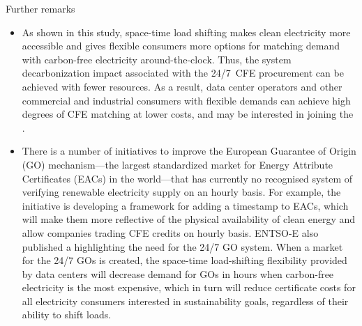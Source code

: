 \begin{frame}{Further remarks}
\label{ssec:remarks}

  {\footnotesize 

  \begin{itemize}

  \item As shown in this study, space-time load shifting makes clean electricity more accessible and gives flexible consumers more options for matching demand with carbon-free electricity around-the-clock. Thus, the system decarbonization impact associated with the 24/7~CFE procurement can be achieved with fewer resources. As a result, data center operators and other commercial and industrial consumers with flexible demands can \alert{achieve high degrees of CFE matching at lower costs}, and may be interested in joining the .
  
  \item There is a number of initiatives to improve the European Guarantee of Origin (GO) mechanism---the largest standardized market for Energy Attribute Certificates (EACs) in the world---that has currently no recognised system of verifying renewable electricity supply on an hourly basis. For example, the  initiative is developing a framework for adding a timestamp to EACs, which will make them more reflective of the physical availability of clean energy and allow companies trading CFE credits on hourly basis. ENTSO-E also published a  highlighting the need for the 24/7 GO system. When a market for the 24/7 GOs is created, the space-time load-shifting flexibility provided by data centers will decrease demand for GOs in hours when carbon-free electricity is the most expensive, which in turn will reduce  certificate costs for \alert{all electricity consumers} interested in sustainability goals, \alert{regardless of their ability to shift loads}.
  
  \end{itemize}
  }

\end{frame}



